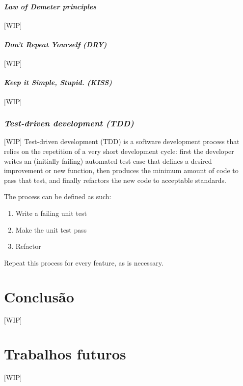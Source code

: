 \documentclass[12pt]{article}
\begin{document}
\subsection{\textit{Law of Demeter principles}} \label{sec:law_of_demeter}
[WIP]

\subsection{\textit{Don't Repeat Yourself (DRY)}} \label{sec:dey}
[WIP]

\subsection{\textit{Keep it Simple, Stupid. (KISS)}} \label{sec:kiss}
[WIP]

\section{\textsl{Test-driven development (TDD)}} \label{sec:tdd}
[WIP]
Test-driven development (TDD) is a software development process that relies on the repetition of a very short development cycle: first the developer writes an (initially failing) automated test case that defines a desired improvement or new function, then produces the minimum amount of code to pass that test, and finally refactors the new code to acceptable standards.

The process can be defined as such:
\begin{enumerate}
	\item Write a failing unit test
	\item Make the unit test pass
	\item Refactor
\end{enumerate}
  

Repeat this process for every feature, as is necessary.

\part{Conclusão} \label{sec:conclusao}
[WIP]

\part{Trabalhos futuros} \label{sec:trabalhos_futuros}
[WIP]



\end{document}
